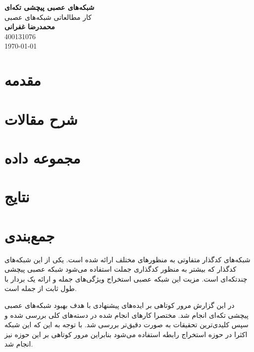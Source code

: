 \documentclass[12pt, a4paper, openany]{book}
\newcommand{\coursetitle}{شبکه‌های عصبی پیچشی تکه‌ای}
\newcommand{\doctitle}{کار مطالعاتی شبکه‌های عصبی}
\newcommand{\name}{محمدرضا غفرانی}
\newcommand{\studentno}{400131076}
\newcommand{\todaydate}{\today}
\begin{document}
\begin{center}
    \huge
    \textbf{\coursetitle} \\
    \vspace{1cm}
    \LARGE
    \doctitle \\
    \vspace{1cm}
    \large
    \textbf{\name} \\
    \studentno \\
    \todaydate
\end{center}

\thispagestyle{plain}

\renewcommand*{\thefootnote}{\arabic{footnote}}

\tableofcontents

\clearpage

\chapter{مقدمه}
\clearpage


\chapter{شرح مقالات}
\clearpage


\clearpage

\clearpage

\clearpage


\chapter{مجموعه داده}
\clearpage


\chapter{نتایج}
\clearpage


\chapter{جمع‌بندی}
\clearpage

شبکه‌های کدگذار متفاوتی به منظور‌های مختلف ارائه شده است.
یکی از این شبکه‌های کدگذار که بیشتر به منظور کدگذاری جملت استفاده می‌شود شبکه عصبی پیچشی چندتکه‌ای
است. مزیت این شبکه عصبی استخراج ویژگی‌های جمله و ارائه یک بردار با طول ثابت از جمله است.

در این گزارش مرور کوتاهی بر ایده‌های پیشنهادی با هدف بهبود شبکه‌های عصبی پیچشی تکه‌ای انجام شد.
مختصرا کار‌های انجام شده در دسته‌های کلی بررسی شده و سپس کلیدی‌ترین تحقیقات
به صورت دقیق‌تر بررسی شد. با توجه به این که این شبکه‌ اکثرا در حوزه استخراج رابطه استفاده می‌شود بنابراین
مرور کوتاهی بر این حوزه نیز انجام شد.
\end{document}
